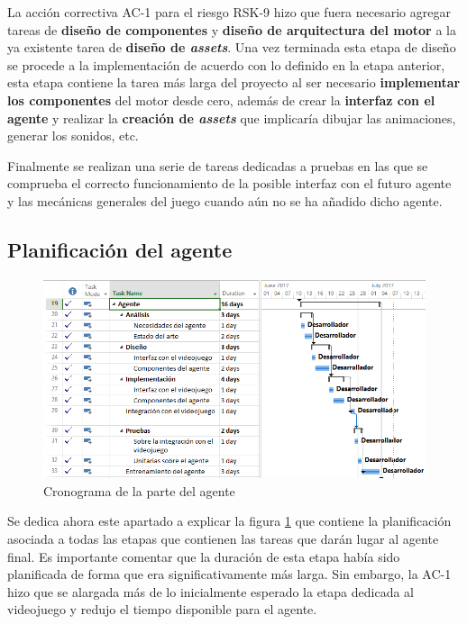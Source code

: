 \bigskip

La acción correctiva AC-1 para el riesgo RSK-9 hizo que fuera necesario agregar tareas de \textbf{diseño de componentes} y \textbf{diseño de arquitectura del motor} a la ya existente tarea de \textbf{diseño de \textit{assets}}. Una vez terminada esta etapa de diseño se procede a la implementación de acuerdo con lo definido en la etapa anterior, esta etapa contiene la tarea más larga del proyecto al ser necesario \textbf{implementar los componentes} del motor desde cero, además de crear la \textbf{interfaz con el agente} y realizar la \textbf{creación de \textit{assets}} que implicaría dibujar las animaciones, generar los sonidos, etc.

\bigskip

Finalmente se realizan una serie de tareas dedicadas a pruebas en las que se comprueba el correcto funcionamiento de la posible interfaz con el futuro agente y las mecánicas generales del juego cuando aún no se ha añadido dicho agente.


\subsection{Planificación del agente}

\begin{figure}
	\centerline{\includegraphics[width=19cm]{otros/capturasPlanificacion/agente.PNG}}
	\caption{Cronograma de la parte del agente}
	\label{plan:agente}
\end{figure}

Se dedica ahora este apartado a explicar la figura \ref{plan:agente} que contiene la planificación asociada a todas las etapas que contienen las tareas que darán lugar al agente final. Es importante comentar que la duración de esta etapa había sido planificada de forma que era significativamente más larga. Sin embargo, la AC-1 hizo que se alargada más de lo inicialmente esperado la etapa dedicada al videojuego y redujo el tiempo disponible para el agente.


